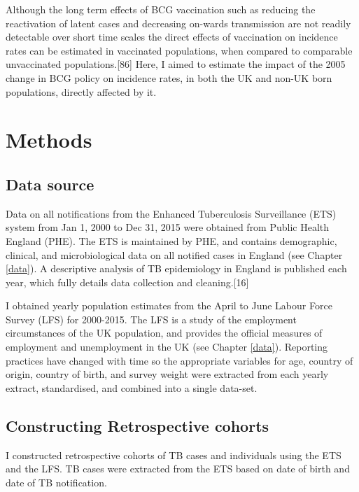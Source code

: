 \documentclass[11pt,twoside]{bristolthesis}
\begin{document}
  Although the long term effects of BCG vaccination such as reducing the reactivation of latent cases and decreasing on-wards transmission are not readily detectable over short time scales the direct effects of vaccination on incidence rates can be estimated in vaccinated populations, when compared to comparable unvaccinated populations.{[}86{]} Here, I aimed to estimate the impact of the 2005 change in BCG policy on incidence rates, in both the UK and non-UK born populations, directly affected by it.
  
  \hypertarget{methods-1}{%
  \section{Methods}\label{methods-1}}
  
  \hypertarget{data-source}{%
  \subsection{Data source}\label{data-source}}
  
  Data on all notifications from the Enhanced Tuberculosis Surveillance (ETS) system from Jan 1, 2000 to Dec 31, 2015 were obtained from Public Health England (PHE). The ETS is maintained by PHE, and contains demographic, clinical, and microbiological data on all notified cases in England (see Chapter \ref{data}). A descriptive analysis of TB epidemiology in England is published each year, which fully details data collection and cleaning.{[}16{]}
  
  I obtained yearly population estimates from the April to June Labour Force Survey (LFS) for 2000-2015. The LFS is a study of the employment circumstances of the UK population, and provides the official measures of employment and unemployment in the UK (see Chapter \ref{data}). Reporting practices have changed with time so the appropriate variables for age, country of origin, country of birth, and survey weight were extracted from each yearly extract, standardised, and combined into a single data-set.
  
  \hypertarget{constructing-retrospective-cohorts}{%
  \subsection{Constructing Retrospective cohorts}\label{constructing-retrospective-cohorts}}
  
  I constructed retrospective cohorts of TB cases and individuals using the ETS and the LFS. TB cases were extracted from the ETS based on date of birth and date of TB notification.
  
\end{document}
